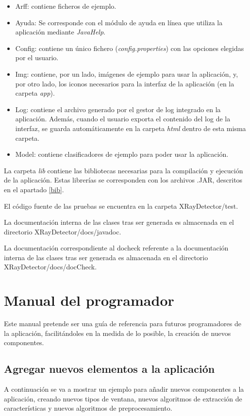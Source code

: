 \begin{itemize}
\item Arff: contiene ficheros \arff{} de ejemplo.
\item Ayuda: Se corresponde con el módulo de ayuda en línea que utiliza la aplicación mediante \textit{JavaHelp}.
\item Config: contiene un único fichero (\textit{config.properties}) con las opciones elegidas por el usuario.
\item Img: contiene, por un lado, imágenes de ejemplo para usar la aplicación, y, por otro lado, los iconos necesarios para la interfaz de la aplicación (en la carpeta \textit{app}).
\item Log: contiene el archivo generado por el gestor de log integrado en la aplicación. Además, cuando el usuario exporta el contenido del log de la interfaz, se guarda automáticamente en la carpeta \textit{html} dentro de esta misma carpeta.
\item Model: contiene clasificadores de ejemplo para poder usar la aplicación.
\end{itemize}

La carpeta \textit{lib} contiene las bibliotecas necesarias para la compilación y ejecución de la aplicación. Estas librerías se corresponden con los archivos .JAR, descritos en el apartado \ref{bib}.

El código fuente de las pruebas se encuentra en la carpeta XRayDetector/test.

La documentación interna de las clases tras ser generada es almacenada en el directorio XRayDetector/docs/javadoc.

La documentación correspondiente al docheck referente a la documentación interna de las clases tras ser generada es almacenada en el directorio XRayDetector/docs/docCheck.

\section{Manual del programador}
Este manual pretende ser una guía de referencia para futuros programadores de la aplicación, facilitándoles en la medida de lo posible, la creación de nuevos componentes.

\subsection{Agregar nuevos elementos a la aplicación}
A continuación se va a mostrar un ejemplo para añadir nuevos componentes a la aplicación, creando nuevos tipos de ventana, nuevos algoritmos de extracción de características y nuevos algoritmos de preprocesamiento.


